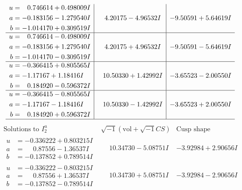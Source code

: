 \documentclass[1p]{elsarticle_modified}
\theoremstyle{definition}
\newcommand{\I}{\sqrt{-1}}
\begin{document}
$$\begin{array}{c|c|c}
\begin{aligned}
u &= \phantom{-}0.746614 + 0.498009 I \\
a &= -0.183156 - 1.279540 I \\
b &= -1.014170 + 0.309519 I\end{aligned}
 & \phantom{-}4.20175 - 4.96532 I & -9.50591 + 5.64619 I \\ \hline\begin{aligned}
u &= \phantom{-}0.746614 - 0.498009 I \\
a &= -0.183156 + 1.279540 I \\
b &= -1.014170 - 0.309519 I\end{aligned}
 & \phantom{-}4.20175 + 4.96532 I & -9.50591 - 5.64619 I \\ \hline\begin{aligned}
u &= -0.366415 + 0.805565 I \\
a &= -1.17167 + 1.18416 I \\
b &= \phantom{-}0.184920 - 0.596372 I\end{aligned}
 & \phantom{-}10.50330 + 1.42992 I & -3.65523 - 2.00550 I \\ \hline\begin{aligned}
u &= -0.366415 - 0.805565 I \\
a &= -1.17167 - 1.18416 I \\
b &= \phantom{-}0.184920 + 0.596372 I\end{aligned}
 & \phantom{-}10.50330 - 1.42992 I & -3.65523 + 2.00550 I\\
 \hline 
 \end{array}$$\newpage$$\begin{array}{c|c|c}  
\text{Solutions to }I^u_{2}& \I (\text{vol} + \sqrt{-1}CS) & \text{Cusp shape}\\
 \hline 
\begin{aligned}
u &= -0.336222 + 0.803215 I \\
a &= \phantom{-}0.87556 - 1.36537 I \\
b &= -0.137852 + 0.789514 I\end{aligned}
 & \phantom{-}10.34730 - 5.08751 I & -3.92984 + 2.90656 I \\ \hline\begin{aligned}
u &= -0.336222 - 0.803215 I \\
a &= \phantom{-}0.87556 + 1.36537 I \\
b &= -0.137852 - 0.789514 I\end{aligned}
 & \phantom{-}10.34730 + 5.08751 I & -3.92984 - 2.90656 I \\ \hline\begin{aligned}

\end{aligned}
\end{array}$$
\end{document}

